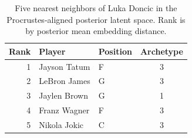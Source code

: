 \begin{table}[htbp]
  \centering\small
  \begin{tabular}{rllc}
    \toprule
    Rank & Player & Position & Archetype \\
    \midrule
    1 & Jayson Tatum & F & 3 \\
    2 & LeBron James & G & 3 \\
    3 & Jaylen Brown & G & 1 \\
    4 & Franz Wagner & F & 3 \\
    5 & Nikola Jokic & C & 3 \\
    \bottomrule
  \end{tabular}
  \caption{Five nearest neighbors of Luka Doncic in the Procrustes-aligned posterior latent space. Rank is by posterior mean embedding distance.}
  \label{tab:Luka_Doncic_neighbors}
\end{table}

